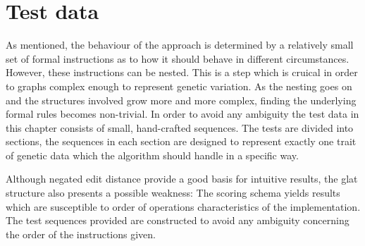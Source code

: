 \documentclass[thesis.tex]{subfiles}
\begin{document}
\section{Test data}
As mentioned, the behaviour of the approach is determined by a relatively small set of formal instructions as to how it should behave in different circumstances. However, these instructions can be nested. This is a step which is cruical in order to graphs complex enough to represent genetic variation. As the nesting goes on and the structures involved grow more and more complex, finding the underlying formal rules becomes non-trivial. In order to avoid any ambiguity the test data in this chapter consists of small, hand-crafted sequences. The tests are divided into sections, the sequences in each section are designed to represent exactly one trait of genetic data which the algorithm should handle in a specific way.\\
\par\noindent
Although negated edit distance provide a good basis for intuitive results, the glat structure also presents a possible weakness: The scoring schema yields results which are susceptible to order of operations characteristics of the implementation. The test sequences provided are constructed to avoid any ambiguity concerning the order of the instructions given.
\end{document}
